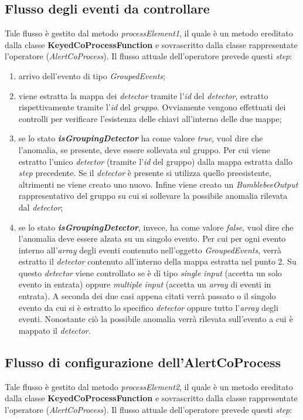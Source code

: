 \subsection{Flusso degli eventi da controllare}\label{sec:pr1-alertcoprocess}
Tale flusso è gestito dal metodo \textit{processElement1}, il quale è un metodo ereditato dalla classe \textbf{KeyedCoProcessFunction} e sovrascritto dalla classe rappresentate l'operatore (\textit{AlertCoProcess}). Il flusso attuale dell'operatore prevede questi \textit{step}:
\begin{enumerate}
	\item{arrivo dell'evento di tipo \textit{GroupedEvents};}
	\item{viene estratta la mappa dei \textit{detector} tramite l'\textit{id} del \textit{detector}, estratto rispettivamente tramite l'\textit{id} del \textit{gruppo}. Ovviamente vengono effettuati dei controlli per verificare l'esistenza delle chiavi all'interno delle due mappe;}
	\item{se lo stato \textbf{\textit{isGroupingDetector}} ha come valore \textit{true}, vuol dire che l'anomalia, se presente, deve essere sollevata sul gruppo. Per cui viene estratto l'unico \textit{detector} (tramite l'\textit{id} del gruppo) dalla mappa estratta dallo \textit{step} precedente. Se il \textit{detector} è presente si utilizza quello preesistente, altrimenti ne viene creato uno nuovo. Infine viene creato un \textit{BumblebeeOutput} rappresentativo del gruppo su cui si sollevare la possibile anomalia rilevata dal \textit{detector};}
	\item{se lo stato \textbf{\textit{isGroupingDetector}}, invece, ha come valore \textit{false}, vuol dire che l'anomalia deve essere alzata su un singolo evento. Per cui per ogni evento interno all'\textit{array} degli eventi contenuto nell'oggetto \textit{GroupedEvents}, verrà estratto il \textit{detector} contenuto all'interno della mappa estratta nel punto 2. Su questo \textit{detector} viene controllato se è di tipo \textit{single input} (accetta un solo evento in entrata) oppure \textit{multiple input} (accetta un \textit{array} di eventi in entrata). A seconda dei due casi appena citati verrà passato o il singolo evento da cui si è estratto lo specifico \textit{detector} oppure tutto l'\textit{array} degli eventi. Nonostante ciò la possibile anomalia verrà rilevata sull'evento a cui è mappato il \textit{detector}.}
\end{enumerate}

\subsection{Flusso di configurazione dell'AlertCoProcess}\label{sec:pr2-alertcoprocess}
Tale flusso è gestito dal metodo \textit{processElement2}, il quale è un metodo ereditato dalla classe \textbf{KeyedCoProcessFunction} e sovrascritto dalla classe rappresentate l'operatore (\textit{AlertCoProcess}). Il flusso attuale dell'operatore prevede questi \textit{step}:

